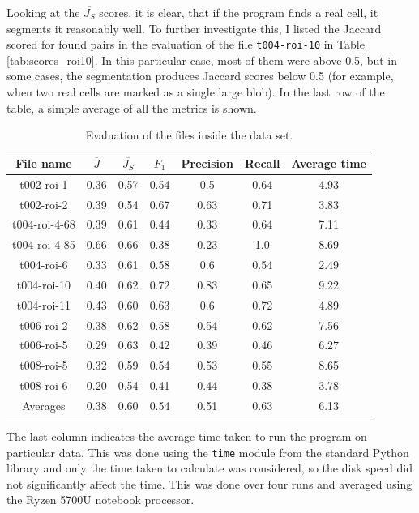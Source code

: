 \documentclass[
  digital,     %
  oneside,     %
  nosansbold,  %
  nocolorbold, %
  lof,         %
  lot,         %
]{fithesis4}
\begin{document}
Looking at the $\overline{J_S}$ scores, it is clear, that if the program finds a
real cell, it segments it reasonably well. To further investigate this, I listed
the Jaccard scored for found pairs in the evaluation of the file
\texttt{t004-roi-10} in Table \ref{tab:scores_roi10}. In this particular case,
most of them were above 0.5, but in some cases, the segmentation produces Jaccard
scores below 0.5 (for example, when two real cells are marked as a single large
blob). In the last row of the table, a simple average of all the metrics is shown.

\begin{table}
    \begin{tabular}{|| c|c|c|c|c|c|c ||}
        \toprule
        File name & $\overline{J}$ & $\overline{J_S}$ & \ensuremath{F_1} & Precision & Recall & Average time\\
        \midrule
        t002-roi-1&0.36&0.57&0.54&0.5&0.64&4.93\\
        t002-roi-2&0.39&0.54&0.67&0.63&0.71&3.83\\
        t004-roi-4-68&0.39&0.61&0.44&0.33&0.64&7.11\\
        t004-roi-4-85&0.66&0.66&0.38&0.23&1.0&8.69\\
        t004-roi-6&0.33&0.61&0.58&0.6&0.54&2.49\\
        t004-roi-10&0.40&0.62&0.72&0.83&0.65&9.22\\
        t004-roi-11&0.43&0.60&0.63&0.6&0.72&4.89\\
        t006-roi-2&0.38&0.62&0.58&0.54&0.62&7.56\\
        t006-roi-5&0.29&0.63&0.42&0.39&0.46&6.27\\
        t008-roi-5&0.32&0.59&0.54&0.53&0.55&8.65\\
        t008-roi-6&0.20&0.54&0.41&0.44&0.38&3.78\\
        \midrule
        Averages&0.38&0.60&0.54&0.51&0.63&6.13\\
        \bottomrule
    \end{tabular}
    \caption{Evaluation of the files inside the data set.}
    \label{tab:scores}
\end{table}

The last column indicates the average time taken to run the program on
particular data. This was done using the \texttt{time} module from the standard
Python library and only the time taken to calculate was considered,
so the disk speed did not significantly affect the time. This was done over
four runs and averaged using the Ryzen 5700U notebook processor.
\end{document}
